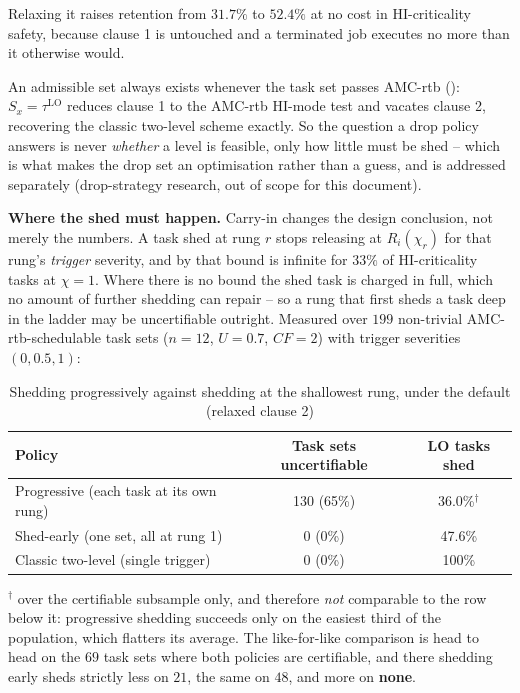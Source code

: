\noindent Relaxing it raises retention from $31.7\%$ to $52.4\%$ at no cost in
HI-criticality safety, because clause 1 is untouched and a terminated job
executes no more than it otherwise would.

An admissible set always exists
whenever the task set passes AMC-rtb (): $S_x = \tau^{\mathrm{LO}}$
reduces clause 1 to the AMC-rtb HI-mode test and vacates clause 2, recovering
the classic two-level scheme exactly. So the question a drop policy answers is
never \emph{whether} a level is feasible, only how little must be shed --
which is what makes the drop set an optimisation rather than a guess, and is
addressed separately (drop-strategy research, out of scope for this document).

\textbf{Where the shed must happen.} Carry-in changes the design conclusion,
not merely the numbers. A task shed at rung $r$ stops releasing at
$R_i(\chi_r)$ for that rung's \emph{trigger} severity, and by
 that bound is infinite for $33\%$ of HI-criticality tasks
at $\chi = 1$. Where there is no bound the shed task is charged in full, which
no amount of further shedding can repair -- so a rung that first sheds a task
deep in the ladder may be uncertifiable outright. Measured over $199$
non-trivial AMC-rtb-schedulable task sets ($n = 12$, $U = 0.7$, $CF = 2$) with
trigger severities $(0, 0.5, 1)$:

\begin{table}[h]
\centering
\caption{Shedding progressively against shedding at the shallowest rung,
under the default (relaxed clause 2)}
\label{tab:shed-early}
\begin{tabular}{lcc}
\toprule
Policy & Task sets uncertifiable & LO tasks shed \\
\midrule
Progressive (each task at its own rung) & 130 (65\%) & 36.0\%$^{\dagger}$ \\
Shed-early (one set, all at rung 1)     & \phantom{13}0 \phantom{9}(0\%) & 47.6\% \\
\midrule
Classic two-level (single trigger)      & \phantom{13}0 \phantom{9}(0\%) & 100\% \\
\bottomrule
\end{tabular}
\end{table}

\noindent $^{\dagger}$ over the certifiable subsample only, and therefore
\emph{not} comparable to the row below it: progressive shedding succeeds only
on the easiest third of the population, which flatters its average. The
like-for-like comparison is head to head on the $69$ task sets where both
policies are certifiable, and there shedding early sheds strictly less on
$21$, the same on $48$, and more on \textbf{none}.

